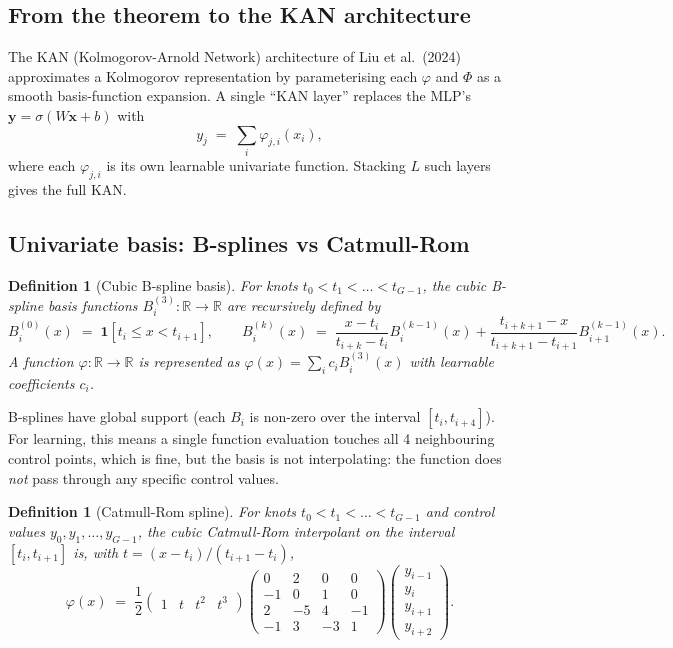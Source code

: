 \documentclass[11pt,a4paper]{article}
\newtheorem{definition}[theorem]{Definition}
\theoremstyle{remark}
\newcommand{\R}{\mathbb{R}}
\newcommand{\indic}[1]{\mathbf{1}\!\left[#1\right]}
\begin{document}
\subsection{From the theorem to the KAN architecture}

The KAN (Kolmogorov-Arnold Network) architecture of Liu et al.\
(2024) approximates a Kolmogorov representation by parameterising
each $\varphi$ and $\Phi$ as a smooth basis-function expansion. A
single ``KAN layer'' replaces the MLP's
$\mathbf{y} = \sigma(W \mathbf{x} + b)$ with
\[
  y_j \;=\; \sum_{i} \varphi_{j, i}(x_i),
\]
where each $\varphi_{j, i}$ is its own learnable univariate
function. Stacking $L$ such layers gives the full KAN.

\subsection{Univariate basis: B-splines vs Catmull-Rom}

\begin{definition}[Cubic B-spline basis]
For knots $t_0 < t_1 < \dots < t_{G-1}$, the cubic B-spline basis
functions $B_i^{(3)} : \R \to \R$ are recursively defined by
\[
  B_i^{(0)}(x) \;=\; \indic{t_i \leq x < t_{i+1}},
  \qquad
  B_i^{(k)}(x) \;=\; \frac{x - t_i}{t_{i+k} - t_i} B_i^{(k-1)}(x)
                     + \frac{t_{i+k+1} - x}{t_{i+k+1} - t_{i+1}} B_{i+1}^{(k-1)}(x).
\]
A function $\varphi : \R \to \R$ is represented as
$\varphi(x) = \sum_i c_i B_i^{(3)}(x)$ with learnable coefficients
$c_i$.
\end{definition}

B-splines have global support (each $B_i$ is non-zero over the
interval $[t_i, t_{i+4}]$). For learning, this means a single
function evaluation touches all 4 neighbouring control points,
which is fine, but the basis is not interpolating: the function
does \emph{not} pass through any specific control values.

\begin{definition}[Catmull-Rom spline]
For knots $t_0 < t_1 < \dots < t_{G-1}$ and control values
$y_0, y_1, \dots, y_{G-1}$, the cubic Catmull-Rom interpolant
on the interval $[t_i, t_{i+1}]$ is, with $t = (x - t_i)/(t_{i+1} - t_i)$,
\[
  \varphi(x) \;=\; \frac{1}{2}
  \begin{pmatrix} 1 & t & t^2 & t^3 \end{pmatrix}
  \begin{pmatrix}
    0 & 2 & 0 & 0 \\
    -1 & 0 & 1 & 0 \\
    2 & -5 & 4 & -1 \\
    -1 & 3 & -3 & 1
  \end{pmatrix}
  \begin{pmatrix} y_{i-1} \\ y_i \\ y_{i+1} \\ y_{i+2} \end{pmatrix}.
\]
\end{definition}
\end{document}
